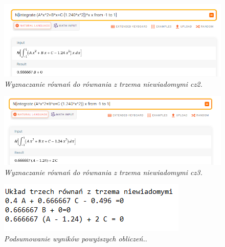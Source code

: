 \documentclass[12pt,oneside,a4paper]{book} %
\begin{document}
\begin{figure}[h]
\begin{center} 
\includegraphics[scale=0.65]{./images/02a.PNG} 
\caption{\textit{Wyznaczanie równań do równania z trzema niewiadomymi cz2.}\newline }
\label{rys:logoup}
\end{center}
\end{figure}

\begin{figure}[h]
\begin{center} 
\includegraphics[scale=0.65]{./images/03a.PNG} 
\caption{\textit{Wyznaczanie równań do równania z trzema niewiadomymi cz3.}\newline }
\label{rys:logoup}
\end{center}
\end{figure}

\begin{figure}[h]
\begin{center} 
\includegraphics[scale=1.5]{./images/04a.PNG} 
\caption{\textit{Podsumowanie wyników powyższych obliczeń.}.\newline }
\label{rys:logoup}
\end{center}
\end{figure}
\end{document}
